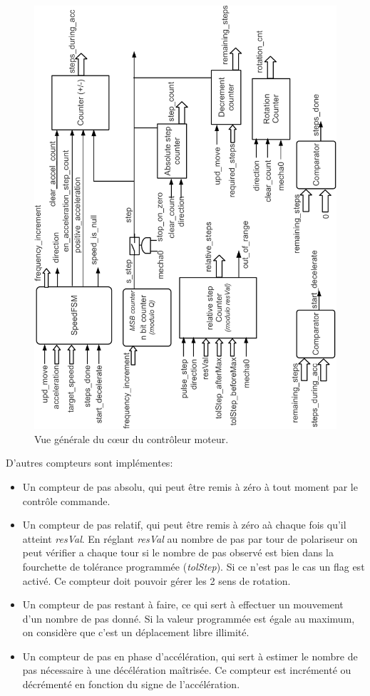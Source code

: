 \documentclass[11pt,a4paper,oneside,onecolumn]{article}
\begin{document}
\begin{figure}[th]
\begin{center}
\includegraphics[angle=-90,width=\textwidth]{./figs/MPPSYNC_general}
\caption{Vue générale du cœur du contrôleur  moteur.}
\label{MPPSYNC_general}
\end{center}
\end{figure}
D'autres compteurs sont implémentes:
\begin{itemize}
 \item Un compteur de pas absolu, qui peut être remis à zéro à tout moment par le contrôle commande.
 \item Un compteur de pas relatif, qui peut être remis à zéro aà chaque fois qu'il atteint \emph{resVal}. En réglant \emph{resVal} au nombre de pas par tour de polariseur on peut vérifier a chaque tour si le nombre de pas observé est bien dans la fourchette de tolérance programmée (\emph{tolStep}). Si ce n'est pas le cas un flag est activé. Ce compteur doit pouvoir gérer les 2 sens de rotation.
 \item Un compteur de pas restant à faire, ce qui sert à effectuer un mouvement d'un nombre de pas donné. Si la valeur programmée est égale au maximum, on considère que c'est un déplacement libre illimité.
 \item Un compteur de pas en phase d'accélération, qui sert à estimer le nombre de pas nécessaire à une décélération maîtrisée. Ce compteur est incrémenté ou décrémenté en fonction du signe de l'accélération. 
\end{itemize}
\end{document}
